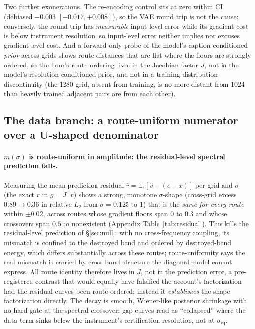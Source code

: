 Two further exonerations. The re-encoding control sits at zero within CI
(debiased $-0.003$ $[-0.017, +0.008]$), so the VAE round trip is
not the cause; conversely, the round trip has
\emph{measurable} input-level error while its gradient cost is below
instrument resolution, so input-level error neither implies nor excuses
gradient-level cost. And a forward-only probe of the model's
caption-conditioned \emph{prior} across grids shows route distances that
are flat where the floors are strongly ordered, so the floor's
route-ordering lives in the Jacobian factor $J$, not in the model's
resolution-conditioned prior, and not in a training-distribution
discontinuity (the 1280 grid, absent from training, is no more distant
from 1024 than heavily trained adjacent pairs are from each other).

\subsection{The data branch: a route-uniform numerator over a U-shaped
denominator}
\label{sec:anatomy}

\paragraph{$m(\sigma)$ is route-uniform in amplitude: the
residual-level spectral prediction fails.}
Measuring the mean prediction residual
$\bar r = \mathbb{E}_\epsilon[\hat v - (\epsilon - x)]$ per grid and
$\sigma$ (the exact $r$ in $g = J^{\!\top} r$) shows a strong,
monotone $\sigma$-shape (cross-grid excess $0.89 \to 0.36$ in relative
$L_2$ from $\sigma{=}0.125$ to $1$) that is the \emph{same for every
route} within $\pm 0.02$, across routes whose gradient floors span $0$ to
$0.3$ and whose crossovers span $0.5$ to nonexistent (Appendix
Table~\ref{tab:residual}). This kills the residual-level prediction of
\S\ref{sec:null}: with no cross-frequency coupling, its mismatch is confined to
the destroyed band and ordered by destroyed-band energy, which differs
substantially across these routes; route-uniformity says the real
mismatch is carried by cross-band structure the diagonal model cannot
express. All route identity therefore lives in $J$, not in the prediction
error, a pre-registered contrast that would equally have falsified the
account's factorization had the residual curves been route-ordered;
instead it \emph{establishes} the shape factorization directly. The
decay is smooth, Wiener-like posterior shrinkage with no hard gate at
the spectral crossover: gap curves read as ``collapsed'' where the
data term sinks below the instrument's certification resolution, not
at $\sigma_{\mathrm{eq}}$.

